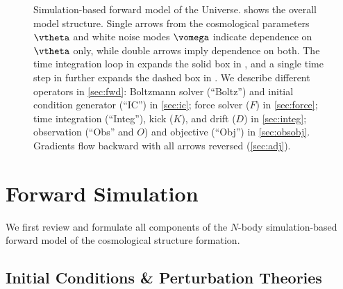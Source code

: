 \documentclass[modern, dvipsnames]{aastex631}
\newcommand{\half}{\nicefrac12}
\begin{document}
\begin{figure}[t]
{
}
\caption{Simulation-based forward model of the Universe.
 shows the overall model structure.
Single arrows from the cosmological parameters $\vtheta$ and white noise
modes $\vomega$ indicate dependence on $\vtheta$ only, while double
arrows imply dependence on both.
The time integration loop in  expands the solid box in
, and a single time step in  further
expands the dashed box in .
We describe different operators in \autoref{sec:fwd}: Boltzmann solver
(``Boltz'') and initial condition generator (``IC'') in
\autoref{sec:ic}; force solver ($F$) in \autoref{sec:force}; time
integration (``Integ''), kick ($K$), and drift ($D$) in
\autoref{sec:integ}; observation (``Obs'' and $O$) and objective
(``Obj'') in \autoref{sec:obsobj}.
Gradients flow backward with all arrows reversed (\autoref{sec:adj}).
}
\end{figure}


\vspace{1em}
\section{Forward Simulation}
\label{sec:fwd}

We first review and formulate all components of the $N$-body
simulation-based forward model of the cosmological structure formation.


\vspace{1em}
\subsection{Initial Conditions \& Perturbation Theories}
\label{sec:ic}
\end{document}
